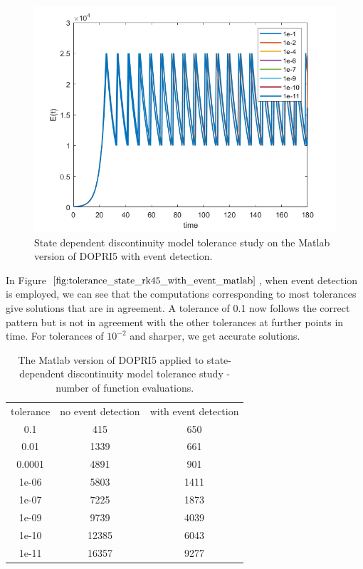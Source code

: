 \begin{figure}[h]
\centering
\includegraphics[width=0.7\linewidth]{./figures/tolerance_state_rk45_with_event_matlab}
\caption{State dependent discontinuity model tolerance study on the Matlab version of DOPRI5 with event detection.}
\label{fig:tolerance_state_rk45_with_event_matlab}
\end{figure}
In Figure $\ref{fig:tolerance_state_rk45_with_event_matlab}$, when event detection is employed, we can see that the computations corresponding to most tolerances give solutions that are in agreement. A tolerance of 0.1 now follows the correct pattern but is not in agreement with the other tolerances at further points in time. For tolerances of $10^{-2}$ and sharper, we get accurate solutions.

\begin{table}[h]
\caption {The Matlab version of DOPRI5 applied to state-dependent discontinuity model tolerance study - number of function evaluations.} 
\label{tab:tolerance_state_discontinuity_rk45_matlab} 
\begin{center}
\begin{tabular}{ c c c }
tolerance & no event detection & with event detection \\
0.1 & 415 & 650 \\
0.01 & 1339 & 661 \\
0.0001 & 4891 & 901 \\
1e-06 & 5803 & 1411 \\
1e-07 & 7225 & 1873 \\
1e-09 & 9739 & 4039 \\
1e-10 & 12385 & 6043 \\
1e-11 & 16357 & 9277 \\
\end{tabular}
\end{center}
\end{table}

